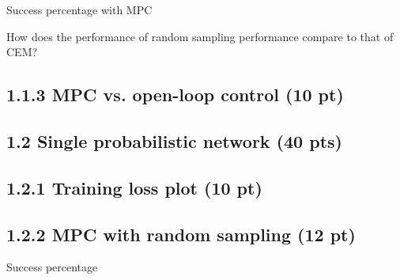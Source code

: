 \documentclass[12pt]{article}
\begin{document}
Success percentage with MPC 
\begin{tcolorbox}[fit,height=1cm, width=5cm, blank, borderline={1pt}{1pt},nobeforeafter]
\begin{center}
\end{center}
\end{tcolorbox}

How does the performance of random sampling performance compare to that of CEM?
\begin{tcolorbox}[fit,height=20em, width=40em, blank, borderline={1pt}{1pt},nobeforeafter]
\begin{center}
\end{center}
\end{tcolorbox}

\subsection*{1.1.3 MPC vs. open-loop control (10 pt)}

\begin{tcolorbox}[fit,height=20em, width=40em, blank, borderline={1pt}{1pt},nobeforeafter]
\begin{center}
\end{center}
\end{tcolorbox}


\subsection*{1.2 Single probabilistic network (40 pts)}

\subsection*{1.2.1 Training loss plot (10 pt)}

\begin{tcolorbox}[fit,height=30em, width=40em, blank, borderline={1pt}{1pt},nobeforeafter]
\begin{center}
\end{center}
\end{tcolorbox}

\subsection*{1.2.2 MPC with random sampling (12 pt)}

Success percentage
\begin{tcolorbox}[fit,height=1cm, width=5cm, blank, borderline={1pt}{1pt},nobeforeafter]
\begin{center}
\end{center}
\end{tcolorbox}
\end{document}
